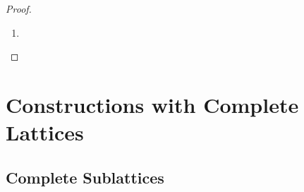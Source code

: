 \documentclass{book}
\begin{document}
\begin{proof}
\begin{enumerate}
\begin{enumerate}
				\begin{align*}
					x
					& \leq \inf A \\
					& = \bigwedge A.
				\end{align*}
				Then $\bigwedge A \in \upar x$, which is a contradiction. Hence there exists $a \in A$ such that $a \in (\upar x)^c$. Since $A \subset L$ with $\bigwedge A \in (\upar x)^c$ is arbitrary, we have that for each $A \subset L$, $\bigwedge A \in (\upar x)^c$ implies that there exists $a \in A$ such that $a \in (\upar x)^c$.
			\end{enumerate}
			Thus $(\upar x)^c \in \MI_{cp}(L)$.
			\item {}
		\end{enumerate}
	\end{proof}
	
	
	
	
	
	
	
	
	
	
	
	
	
	
	
	
	
	
	
	
	
	
	
	
	
	
	
	
	
	
	
	
	
	
	
	
	
	
	
	
	
	
	
	
	
	
	
	
	
	
	
	
	
	
	
	\newpage 
	\section{Constructions with Complete Lattices}
	
	\subsection{Complete Sublattices}
	
\end{document}
